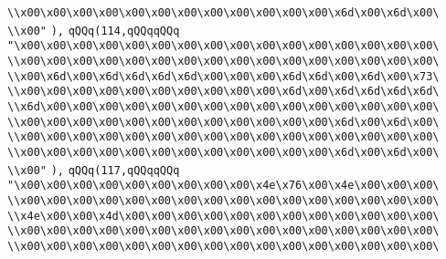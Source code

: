 \verb|\\x00\x00\x00\x00\x00\x00\x00\x00\x00\x00\x00\x00\x6d\x00\x6d\x00\|\newline
\verb|\\x00"|\newline
\verb|),|\newline
\verb|qQQq(114,qQQqqQQq|\newline
\verb|"\x00\x00\x00\x00\x00\x00\x00\x00\x00\x00\x00\x00\x00\x00\x00\x00\|\newline
\verb|\\x00\x00\x00\x00\x00\x00\x00\x00\x00\x00\x00\x00\x00\x00\x00\x00\|\newline
\verb|\\x00\x6d\x00\x6d\x6d\x6d\x6d\x00\x00\x00\x6d\x6d\x00\x6d\x00\x73\|\newline
\verb|\\x00\x00\x00\x00\x00\x00\x00\x00\x00\x00\x6d\x00\x6d\x6d\x6d\x6d\|\newline
\verb|\\x6d\x00\x00\x00\x00\x00\x00\x00\x00\x00\x00\x00\x00\x00\x00\x00\|\newline
\verb|\\x00\x00\x00\x00\x00\x00\x00\x00\x00\x00\x00\x00\x6d\x00\x6d\x00\|\newline
\verb|\\x00\x00\x00\x00\x00\x00\x00\x00\x00\x00\x00\x00\x00\x00\x00\x00\|\newline
\verb|\\x00\x00\x00\x00\x00\x00\x00\x00\x00\x00\x00\x00\x6d\x00\x6d\x00\|\newline
\verb|\\x00"|\newline
\verb|),|\newline
\verb|qQQq(117,qQQqqQQq|\newline
\verb|"\x00\x00\x00\x00\x00\x00\x00\x00\x00\x4e\x76\x00\x4e\x00\x00\x00\|\newline
\verb|\\x00\x00\x00\x00\x00\x00\x00\x00\x00\x00\x00\x00\x00\x00\x00\x00\|\newline
\verb|\\x4e\x00\x00\x4d\x00\x00\x00\x00\x00\x00\x00\x00\x00\x00\x00\x00\|\newline
\verb|\\x00\x00\x00\x00\x00\x00\x00\x00\x00\x00\x00\x00\x00\x00\x00\x00\|\newline
\verb|\\x00\x00\x00\x00\x00\x00\x00\x00\x00\x00\x00\x00\x00\x00\x00\x00\|\newline
